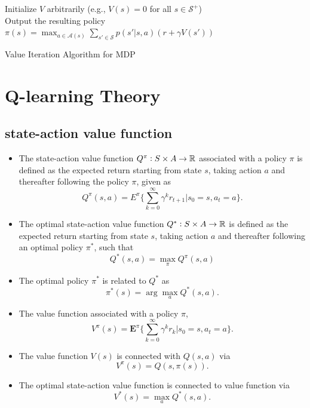 \begin{refsection}
\begin{algorithm}\label{ch:reinforcement-learning:alg:valueIterationAlg}
	Initialize $V$ arbitrarily (e.g., $V(s)=0$ for all $s \in \mathcal{S}^+$)\\
	Output the resulting policy
	$\pi(s) = \max_{a\in\mathcal{A}(s)}\sum_{s' \in \mathcal{S}}p(s'|s,a)(r + \gamma V(s'))$ \\
	\KwRet{$\pi$}
	\caption{Value Iteration Algorithm for MDP}
\end{algorithm}

\section{Q-learning Theory}

\subsection{state-action value function}


\begin{definition}\cite[16]{wiering2012reinforcement}
	\begin{itemize}
		\item The state-action value function $Q^\pi:S\times A\to \mathbb{R}$ associated with a policy $\pi$ is defined as the expected return starting from state $s$, taking action $a$ and thereafter following the policy $\pi$, given as
		$$Q^\pi(s,a) = E^\pi \{\sum_{k=0}^\infty \gamma^k r_{t+1}|s_0 = s,a_t = a\}.$$
		\item The optimal state-action value function $Q^*:S\times A\to \mathbb{R}$  is defined as the expected return starting from state $s$, taking action $a$ and thereafter following an optimal policy $\pi^*$, such that
		$$Q^*(s,a) = \max_{\pi} Q^\pi(s,a) $$
		\item The optimal policy $\pi^*$ is related to $Q^*$ as
		$$\pi^*(s) = \arg \max_a Q^*(s,a).$$  
		\item The value function associated with a policy $\pi$, 
		$$V^\pi(s) = \mathbf{E}^\pi \{\sum_{k=0}^\infty \gamma^k r_{k}|s_0 = s,a_t = a\}.$$
		\item The value function $V(s)$ is connected with $Q(s,a)$ via
		$$V^\pi(s) = Q(s, \pi(s)).$$
		\item The optimal state-action value function is connected to value function via
		$$V^*(s) = \max_{a} Q^*(s,a).$$	
	\end{itemize}
\end{definition}


\end{refsection}
